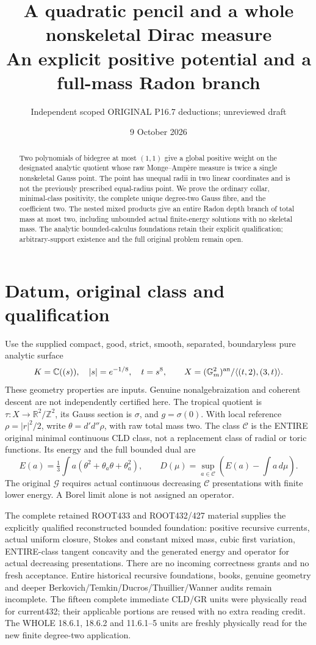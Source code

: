 \documentclass[11pt]{article}
\title{A quadratic pencil and a whole nonskeletal Dirac measure\\
An explicit positive potential and a full-mass Radon branch}
\author{Independent scoped ORIGINAL P16.7 deductions; unreviewed draft}
\date{9 October 2026}
\newcommand{\DD}{d'd''}
\newcommand{\C}{\mathcal C}
\newcommand{\G}{\mathcal G}
\begin{document}
\maketitle
\begin{abstract}
Two polynomials of bidegree at most $(1,1)$ give a global positive
weight on the designated analytic quotient whose raw Monge--Amp\`ere
measure is twice a single nonskeletal Gauss point. The point has unequal
radii in two linear coordinates and is not the previously prescribed
equal-radius point. We prove the ordinary collar, minimal-class positivity,
the complete unique degree-two Gauss fibre, and the coefficient two.
The nested mixed products give an entire Radon depth branch of total
mass at most two, including unbounded actual finite-energy solutions
with no skeletal mass. The analytic bounded-calculus foundations retain
their explicit qualification; arbitrary-support existence and the full
original problem remain open.
\end{abstract}

\section{Datum, original class and qualification}
Use the supplied compact, good, strict, smooth, separated, boundaryless
pure analytic surface
\[
 K=\mathbb C((s)),\quad |s|=e^{-1/8},\quad t=s^8,\qquad
 X=(\mathbb G_m^2)^{\rm an}/\langle(t,2),(3,t)\rangle.
\]
These geometry properties are inputs. Genuine nonalgebraization and
coherent descent are not independently certified here.
The tropical quotient is $\tau:X\to\mathbb R^2/\mathbb Z^2$, its Gauss
section is $\sigma$, and $g=\sigma(0)$. With local reference
$\rho=|r|^2/2$, write $\theta=\DD\rho$, with raw total mass two.
The class $\C$ is the ENTIRE original minimal continuous CLD class,
not a replacement class of radial or toric functions. Its energy and
the full bounded dual are
\[
 E(a)=\tfrac13\int a(\theta^2+\theta_a\theta+\theta_a^2),\qquad
 D(\mu)=\sup_{a\in\C}\left(E(a)-\int a\,d\mu\right).
\]
The original $\G$ requires actual continuous decreasing $\C$
presentations with finite lower energy. A Borel limit alone is not
assigned an operator.

The complete retained ROOT433 and ROOT432/427 material supplies the
explicitly qualified reconstructed bounded foundation: positive
recursive currents, actual uniform closure, Stokes and constant mixed
mass, cubic first variation, ENTIRE-class tangent concavity and the
generated energy and operator for actual decreasing presentations.
There are no incoming correctness grants and no fresh acceptance.
Entire historical recursive foundations, books, genuine geometry and
deeper Berkovich/Temkin/Ducros/Thuillier/Wanner audits remain incomplete.
The fifteen complete immediate CLD/GR units were physically read for
current432; their applicable portions are reused with no extra reading
credit. The WHOLE 18.6.1, 18.6.2 and 11.6.1--5 units are freshly
physically read for the new finite degree-two application.
\end{document}
